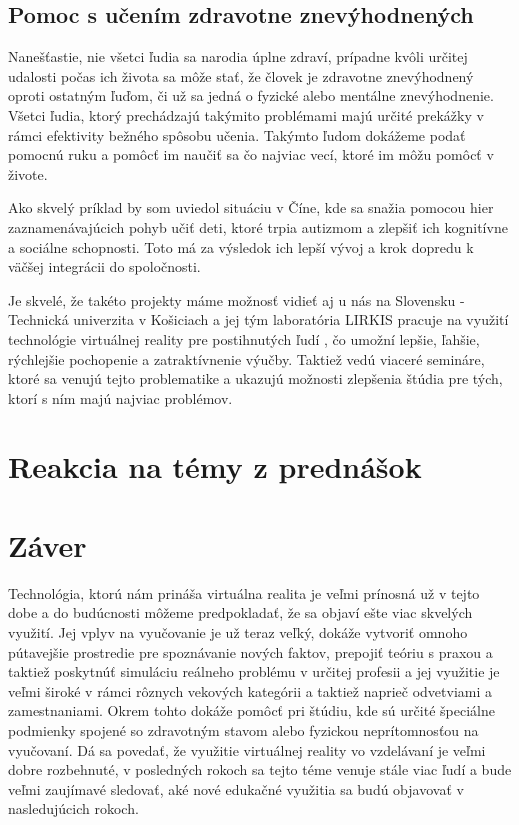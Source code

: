 \documentclass[10pt,twoside,slovak,a4paper]{article}
\begin{document}
\subsection{Pomoc s učením zdravotne znevýhodnených} \label{pomoc}
Nanešťastie, nie všetci ľudia sa narodia úplne zdraví, prípadne kvôli určitej udalosti počas ich života sa môže stať, že človek je zdravotne znevýhodnený oproti ostatným ľuďom, či už sa jedná o fyzické alebo mentálne znevýhodnenie. Všetci ľudia, ktorý prechádzajú takýmito problémami majú určité prekážky v rámci efektivity bežného spôsobu učenia. Takýmto ľudom dokážeme podať pomocnú ruku a pomôcť im naučiť sa čo najviac vecí, ktoré im môžu pomôcť v živote. 

Ako skvelý príklad by som uviedol situáciu v Číne,\cite{hry} kde sa snažia pomocou hier zaznamenávajúcich pohyb učiť deti, ktoré trpia autizmom a zlepšiť ich kognitívne a sociálne schopnosti. Toto má za výsledok ich lepší vývoj a krok dopredu k väčšej integrácii do spoločnosti.

Je skvelé, že takéto projekty máme možnosť vidieť aj u nás na Slovensku - Technická univerzita v Košiciach a jej tým laboratória LIRKIS pracuje na využití technológie virtuálnej reality pre postihnutých ľudí \cite{svk}, čo umožní lepšie, ľahšie, rýchlejšie pochopenie a zatraktívnenie výučby. Taktiež vedú viaceré semináre, ktoré sa venujú tejto problematike a ukazujú možnosti zlepšenia štúdia pre tých, ktorí s ním majú najviac problémov.

\section{Reakcia na témy z prednášok} \label{piata}


\section{Záver} \label{zaver} 
Technológia, ktorú nám prináša virtuálna realita je veľmi prínosná už v tejto dobe a do budúcnosti môžeme predpokladať, že sa objaví ešte viac skvelých využití. Jej vplyv na vyučovanie je už teraz veľký, dokáže vytvoriť omnoho pútavejšie prostredie pre spoznávanie nových faktov, prepojiť teóriu s praxou a taktiež poskytnúť simuláciu reálneho problému v určitej profesii a jej využitie je veľmi široké v rámci rôznych vekových kategórii a taktiež naprieč odvetviami a zamestnaniami. Okrem tohto dokáže pomôcť pri štúdiu, kde sú určité špeciálne podmienky spojené so zdravotným stavom alebo fyzickou neprítomnosťou na vyučovaní. Dá sa povedať, že využitie virtuálnej reality vo vzdelávaní je veľmi dobre rozbehnuté, v posledných rokoch sa tejto téme venuje stále viac ľudí a bude veľmi zaujímavé sledovať, aké nové edukačné využitia sa budú objavovať v nasledujúcich rokoch.







\end{document}
